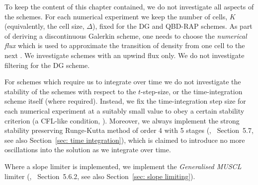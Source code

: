 
To keep the content of this chapter contained, we do not investigate all aspects of the schemes. For each numerical experiment we keep the number of cells, \(K\) (equivalently, the cell size, \(\Delta\)), fixed for the DG and QBD-RAP schemes. As part of deriving a discontinuous Galerkin scheme, one needs to choose the \emph{numerical flux} which is used to approximate the transition of density from one cell to the next \citep{nodalDGBook}. We investigate schemes with an upwind flux only. We do not investigate filtering for the DG scheme.

For schemes which require us to integrate over time we do not investigate the stability of the schemes with respect to the \(t\)-step-size, or the time-integration scheme itself (where required). Instead, we fix the time-integration step size for each numerical experiment at a suitably small value to obey a certain stability criterion (a CFL-like condition, \citep[Section~4.8]{nodalDGBook}). Moreover, we always implement the strong stability preserving Runge-Kutta method of order 4 with 5 stages (\cite{sr2002}, \cite{nodalDGBook}~Section~5.7, see also Section~\ref{sec: time integration}), which is claimed to introduce no more oscillations into the solution as we integrate over time. 

Where a slope limiter is implemented, we implement the \emph{Generalised MUSCL} limiter (\cite{c99}, \cite{nodalDGBook}~Section~5.6.2, see also Section~\ref{sec: slope limiting}). 

